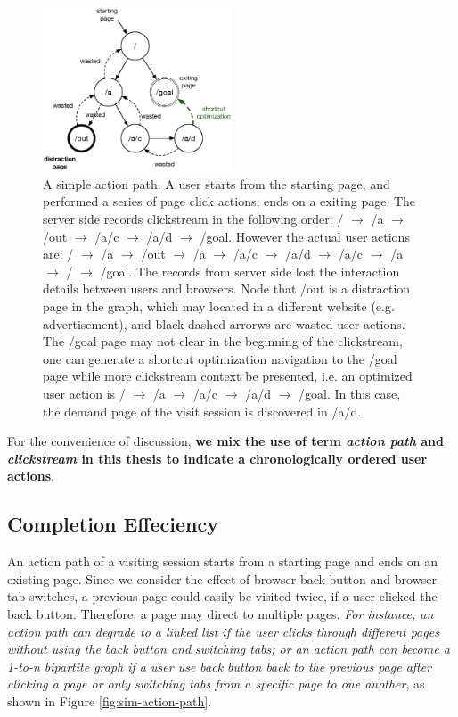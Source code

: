\begin{figure}[H]
    \centering
    \includegraphics[width=0.5\textwidth]{figures/clickstream}
    \caption{A simple action path. A user starts from the starting page, and performed
    a series of page click actions, ends on a exiting page. 
    The server side records clickstream in the following order:
    / $\rightarrow$ /a $\rightarrow$ /out $\rightarrow$ /a/c $\rightarrow$ /a/d $\rightarrow$ /goal.
    However the actual user actions are: 
    / $\rightarrow$ /a $\rightarrow$ /out $\rightarrow$ /a $\rightarrow$ /a/c $\rightarrow$ /a/d 
    $\rightarrow$ /a/c $\rightarrow$ /a $\rightarrow$ / $\rightarrow$ /goal. 
    The records from server side lost the interaction details between users and browsers.
    Node that /out is a distraction page in the graph, 
    which may located in a different website (e.g. advertisement), 
    and black dashed arrorws are wasted user
    actions. The /goal page may not clear in the beginning of the clickstream, one can generate
    a shortcut optimization navigation to the /goal page while more clickstream context
    be presented, i.e. an optimized user action is 
    / $\rightarrow$ /a $\rightarrow$ /a/c $\rightarrow$ /a/d $\rightarrow$ /goal. In this case,
    the demand page of the visit session is discovered in /a/d.}
    \label{fig:clickstream}
\end{figure}

For the convenience of discussion, \textbf{we mix the use of 
term \emph{action path} and \emph{clickstream} in
this thesis to indicate a chronologically ordered user actions}.

\subsection{Completion Effeciency}

An action path of a visiting session starts from a starting page and ends on an existing page.
Since we consider the effect of browser back button and browser tab switches, 
a previous page could easily be visited twice, if a user clicked the back button. 
Therefore, a page may direct to multiple pages. \emph{For instance, 
an action path can degrade to a linked list if the user clicks through different pages 
without using the back button and switching tabs; or an action path can become 
a 1-to-n bipartite graph if a user use back button back to the previous page after 
clicking a page or only switching tabs from a specific page to one another}, 
as shown in Figure \ref{fig:sim-action-path}.

